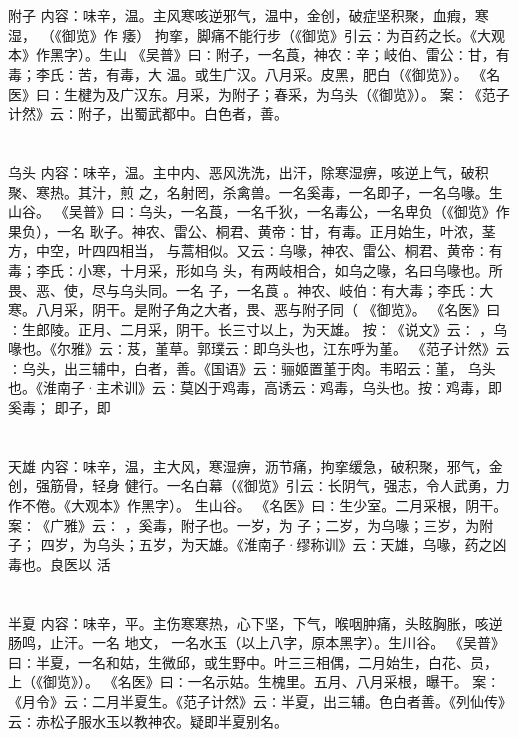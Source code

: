 \documentclass[12pt,UTF8]{ctexbook}
\begin{document}
\chapter{}附子
内容：味辛，温。主风寒咳逆邪气，温中，金创，破症坚积聚，血瘕，寒湿， （《御览》作 
痿） 拘挛，脚痛不能行步（《御览》引云∶为百药之长。《大观本》作黑字）。生山 
《吴普》曰∶附子，一名莨，神农∶辛；岐伯、雷公∶甘，有毒；李氏∶苦，有毒，大 
温。或生广汉。八月采。皮黑，肥白（《御览》）。 
《名医》曰∶生楗为及广汉东。月采，为附子；春采，为乌头（《御览》）。 
案∶《范子计然》云∶附子，出蜀武都中。白色者，善。 


\chapter{}乌头
内容：味辛，温。主中内、恶风洗洗，出汗，除寒湿痹，咳逆上气，破积聚、寒热。其汁，煎 
之，名射罔，杀禽兽。一名奚毒，一名即子，一名乌喙。生山谷。 
《吴普》曰∶乌头，一名莨，一名千狄，一名毒公，一名卑负（《御览》作果负），一名 
耿子。神农、雷公、桐君、黄帝∶甘，有毒。正月始生，叶浓，茎方，中空，叶四四相当， 
与蒿相似。又云∶乌喙，神农、雷公、桐君、黄帝∶有毒；李氏∶小寒，十月采，形如乌 
头，有两岐相合，如乌之喙，名曰乌喙也。所畏、恶、使，尽与乌头同。一名 子，一名莨 
。神农、岐伯∶有大毒；李氏∶大寒。八月采，阴干。是附子角之大者，畏、恶与附子同（ 
《御览》。 
《名医》曰∶生郎陵。正月、二月采，阴干。长三寸以上，为天雄。 
按∶《说文》云∶ ，乌喙也。《尔雅》云∶芨，堇草。郭璞云∶即乌头也，江东呼为堇。 
《范子计然》云∶乌头，出三辅中，白者，善。《国语》云∶骊姬置堇于肉。韦昭云∶堇， 
乌头也。《淮南子·主术训》云∶莫凶于鸡毒，高诱云∶鸡毒，乌头也。按∶鸡毒，即奚毒； 
即子，即 


\chapter{}天雄
内容：味辛，温，主大风，寒湿痹，沥节痛，拘挛缓急，破积聚，邪气，金创，强筋骨，轻身 
健行。一名白幕（《御览》引云∶长阴气，强志，令人武勇，力作不倦。《大观本》作黑字）。 
生山谷。 
《名医》曰∶生少室。二月采根，阴干。 
案∶《广雅》云∶ ，奚毒，附子也。一岁，为 子；二岁，为乌喙；三岁，为附子； 
四岁，为乌头；五岁，为天雄。《淮南子·缪称训》云∶天雄，乌喙，药之凶毒也。良医以 
活 


\chapter{}半夏
内容：味辛，平。主伤寒寒热，心下坚，下气，喉咽肿痛，头眩胸胀，咳逆肠鸣，止汗。一名 
地文， 
一名水玉（以上八字，原本黑字）。生川谷。 
《吴普》曰∶半夏，一名和姑，生微邱，或生野中。叶三三相偶，二月始生，白花、员， 
上（《御览》）。 
《名医》曰∶一名示姑。生槐里。五月、八月采根，曝干。 
案∶《月令》云∶二月半夏生。《范子计然》云∶半夏，出三辅。色白者善。《列仙传》 
云∶赤松子服水玉以教神农。疑即半夏别名。 
\end{document}
